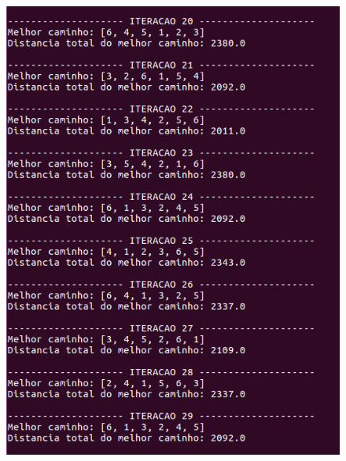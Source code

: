 \documentclass[hidelinks,12pt]{article}
\begin{document}
		\begin{figure}[!h]
			\centering
			\includegraphics[scale=0.6]{Figures/m6-1-3.png}
		\end{figure}

		\newpage
\end{document}
